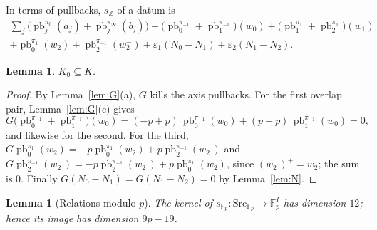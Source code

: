\documentclass[11pt]{article}
\newtheorem{lemma}[theorem]{Lemma}
\theoremstyle{definition}
\theoremstyle{remark}
\newcommand{\Z}{\mathbb{Z}}
\newcommand{\F}{\mathbb{F}}
\newcommand{\pb}{\operatorname{pb}}
\newcommand{\SAT}{K_0}
\begin{document}
In terms of pullbacks, $s_\Z$ of a datum is
\begin{multline*}
\sum_j\big(\pb_j^{\pi_0}(a_j)+\pb_j^{\pi_\infty}(b_j)\big)+\big(\pb_0^{\pi_{-1}}+\pb_1^{\pi_{-1}}\big)(w_0)+\big(\pb_1^{\pi_1}+\pb_2^{\pi_1}\big)(w_1)\\
+\pb_0^{\pi_1}(w_2)+\pb_2^{\pi_{-1}}(w_2^-)+\varepsilon_1(N_0-N_1)+\varepsilon_2(N_1-N_2).
\end{multline*}

\begin{lemma}\label{lem:SATK}
$\SAT\subseteq K$.
\end{lemma}

\begin{proof}
By Lemma~\ref{lem:G}(a), $G$ kills the axis pullbacks. For the first overlap pair, Lemma~\ref{lem:G}(c) gives
\[G\big(\pb_0^{\pi_{-1}}+\pb_1^{\pi_{-1}}\big)(w_0)=(-p+p)\,\pb_0^{\pi_{-1}}(w_0)+(p-p)\,\pb_1^{\pi_{-1}}(w_0)=0,\] and likewise for the second. For the third, $G\pb_0^{\pi_1}(w_2)=-p\pb_0^{\pi_1}(w_2)+p\pb_2^{\pi_{-1}}(w_2^-)$ and $G\pb_2^{\pi_{-1}}(w_2^-)=-p\pb_2^{\pi_{-1}}(w_2^-)+p\pb_0^{\pi_1}(w_2)$, since $(w_2^-)^+=w_2$; the sum is $0$. Finally $G(N_0-N_1)=G(N_1-N_2)=0$ by Lemma~\ref{lem:N}.
\end{proof}

\begin{lemma}[Relations modulo $p$]\label{lem:C}
The kernel of $s_{\F_p}:\mathrm{Src}_{\F_p}\to\F_p^I$ has dimension $12$; hence its image has dimension $9p-19$.
\end{lemma}
\end{document}
